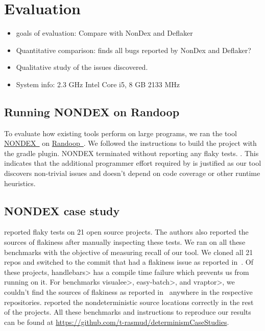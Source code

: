 \section{Evaluation}
\begin{itemize}
    \item goals of evaluation: Compare with NonDex and Deflaker
    \item Quantitative comparison: \TheDeterminismChecker finds all bugs reported by NonDex and Deflaker?
    \item Qualitative study of the issues discovered.
    \item System info: 2.3 GHz Intel Core i5, 8 GB 2133 MHz
\end{itemize}

\subsection{Running NONDEX on Randoop}
To evaluate how existing tools perform on large programs, we ran the tool \href{https://github.com/TestingResearchIllinois/NonDex}{NONDEX~\cite{nondex}} on 
\href{https://github.com/randoop/randoop}{Randoop~\cite{randoop}}.
We followed the instructions to build the project with the gradle plugin. 
NONDEX terminated without reporting any flaky tests.
.
This indicates that the additional programmer effort required by \TheDeterminismChecker is justified
as our tool discovers non-trivial issues and doesn't depend on code coverage or other runtime heuristics.

\subsection{NONDEX case study}
\cite{nondex} reported flaky tests on 21 open source projects. The authors also reported the sources of flakiness
after manually inspecting these tests. We ran \TheDeterminismChecker on all these benchmarks with the objective
of measuring recall of our tool. We cloned all 21 repos and switched to the commit that had a flakiness issue as reported 
in~\cite{nondex}. Of these projects, \<handlebars> has a compile time failure which prevents us from running \TheDeterminismChecker on it. For benchmarks \<visualee>, \<easy-batch>, and \<vraptor>, we couldn't find
the sources of flakiness as reported in~\cite{nondex} anywhere in the respective repositories.
\TheDeterminismChecker reported the nondeterministic source locations correctly in the rest of the projects.
All these benchmarks and instructions to reproduce our results can be found at \href{https://github.com/t-rasmud/determinismCaseStudies}{https://github.com/t-rasmud/determinismCaseStudies}.

